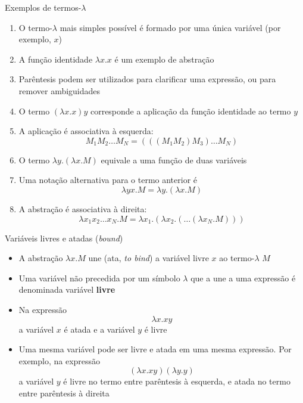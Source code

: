 \begin{frame}[fragile]{Exemplos de termos-$\lambda$}

    \begin{enumerate}
        \item O termo-$\lambda$ mais simples possível é formado por uma única variável (por 
            exemplo, $x$)

        \item A função identidade $\lambda x.x$ é um exemplo de abstração

        \item Parêntesis podem ser utilizados para clarificar uma expressão, ou para remover
            ambiguidades

        \item O termo $(\lambda x.x)y$ corresponde a aplicação da função identidade ao termo $y$

        \item A aplicação é associativa à esquerda:
        \[
            M_1M_2\ldots M_N = (((M_1M_2)M_3)\ldots M_N)
        \]

        \item O termo $\lambda y.(\lambda x.M)$ equivale a uma função de duas variáveis

        \item Uma notação alternativa para o termo anterior é 
        \[
            \lambda yx.M = \lambda y.(\lambda x.M)
        \]

        \item A abstração é associativa à direita:
        \[
            \lambda x_1x_2\ldots x_N.M = \lambda x_1.(\lambda x_2.(\ldots (\lambda x_N.M)))
        \]
    \end{enumerate}

\end{frame}

\begin{frame}[fragile]{Variáveis livres e atadas ({\it bound})}

    \begin{itemize}
        \item A abstração $\lambda x.M$ une (ata, \textit{to bind}) a variável livre $x$ ao
            termo-$\lambda$ $M$

        \item Uma variável não precedida por um símbolo $\lambda$ que a une a uma expressão
            é denominada variável \textbf{livre}

        \item Na expressão 
        \[
            \lambda x.xy
        \]
        a variável $x$ é atada e a variável $y$ é livre

        \item Uma mesma variável pode ser livre e atada em uma mesma expressão. Por exemplo,
            na expressão
        \[
            (\lambda x.xy)(\lambda y.y)
        \]
        a variável $y$ é livre no termo entre parêntesis à esquerda, e atada no termo entre
        parêntesis à  direita

    \end{itemize}

\end{frame}

